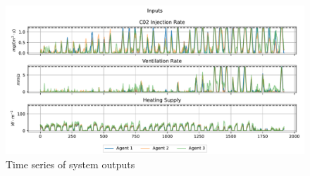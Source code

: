 \begin{figure}[H]
    \centering
    \includegraphics[width = \textwidth]{figures/selected_policies_inputs.pdf}
    \caption{Time series of system outputs}
    \label{fig:selected-policies-inputs}
\end{figure}

